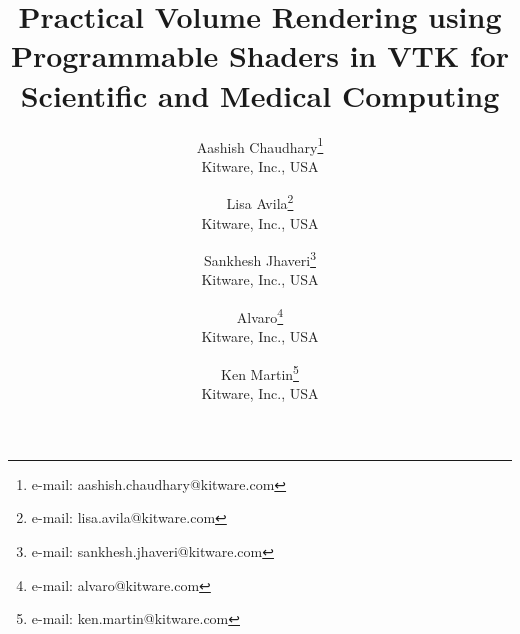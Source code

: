 \title{Practical Volume Rendering using Programmable Shaders in VTK for Scientific and Medical Computing}

\author{Aashish Chaudhary\thanks{e-mail: aashish.chaudhary@kitware.com}\\ %
        \scriptsize Kitware, Inc., USA%
\and Lisa Avila\thanks{e-mail: lisa.avila@kitware.com}\\ %
        \scriptsize Kitware, Inc., USA %
\and Sankhesh Jhaveri\thanks{e-mail: sankhesh.jhaveri@kitware.com}\\ %
        \scriptsize Kitware, Inc., USA %
\and Alvaro\thanks{e-mail: alvaro@kitware.com}\\ %
        \scriptsize Kitware, Inc., USA %
\and Ken Martin\thanks{e-mail: ken.martin@kitware.com}\\ %
        \scriptsize Kitware, Inc., USA %
}